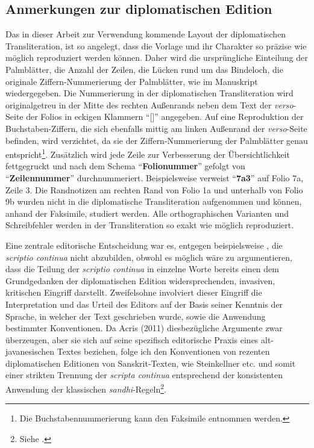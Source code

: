 \documentclass[a4paper,12pt]{article}
\begin{document}
{\subsection{Anmerkungen zur diplomatischen Edition}

Das in dieser Arbeit zur Verwendung kommende Layout der diplomatischen Transliteration, ist so angelegt, dass die Vorlage und ihr Charakter so präzise wie möglich reproduziert werden können. Daher wird die ursprüngliche Einteilung der Palmblätter, die Anzahl der Zeilen, die Lücken rund um das Bindeloch, die originale Ziffern-Nummerierung der Palmblätter, wie im Manuskript wiedergegeben. Die Nummerierung in der diplomatischen Transliteration wird originalgetreu in der Mitte des rechten Außenrands neben dem Text der \textit{verso}-Seite der Folios in eckigen Klammern ``[]'' angegeben. Auf eine Reproduktion der Buchstaben-Ziffern, die sich ebenfalls mittig am linken Außenrand der \textit{verso}-Seite befinden, wird verzichtet, da sie der Ziffern-Nummerierung der Palmblätter genau entspricht\footnote{Die Buchstabennummerierung kann den Faksimile entnommen werden.}. Zusätzlich wird jede Zeile zur Verbesserung der Übersichtlichkeit fettgegruckt und nach dem Schema ``\textbf{Folionummer}'' gefolgt von ``\textbf{Zeilennummer}'' durchnummeriert. Beispielsweise verweist ``\textbf{7a3}'' auf Folio 7a, Zeile 3. Die Randnotizen am rechten Rand von Folio 1a und unterhalb von Folio 9b wurden nicht in die diplomatische Transliteration aufgenommen und können, anhand der Faksimile, studiert werden. Alle orthographischen Varianten und Schreibfehler werden in der Transliteration so exakt wie möglich reproduziert. 

Eine zentrale editorische Entscheidung war es, entgegen beispielsweise \parencite{acri2011dharma}, die \textit{scriptio continua} nicht abzubilden, obwohl es möglich wäre zu argumentieren, dass die Teilung der \textit{scriptio continua} in einzelne Worte bereits einen dem Grundgedanken der diplomatischen Edition widersprechenden, invasiven, kritischen Eingriff darstellt. Zweifelsohne involviert dieser Eingriff die Interpretation und das Urteil des Editors auf der Basis seiner Kenntnis der Sprache, in welcher der Text geschrieben wurde, sowie die Anwendung bestimmter Konventionen. Da Acris (2011) diesbezügliche Argumente zwar überzeugen, aber sie sich auf seine spezifisch editorische Praxis eines  alt-javanesischen Textes beziehen, folge ich den Konventionen von rezenten diplomatischen Editionen von Sanskrit-Texten, wie Steinkellner etc. und somit einer strikten Trennung der \textit{scripta continua} entsprechend der konsistenten Anwendung der klassischen \textit{sandhi}-Regeln\footnote{Siehe \parencite[8-13]{stenzler}.}.   

}
\end{document}
